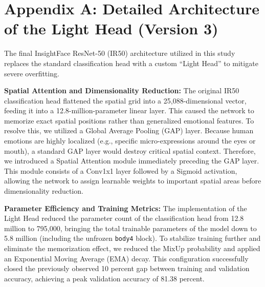 \section{Appendix A: Detailed Architecture of the Light Head (Version 3)}
\label{sec:IR50}

The final InsightFace ResNet-50 (IR50) architecture utilized in this study replaces the standard classification head with a custom ``Light Head'' to mitigate severe overfitting. 

\textbf{Spatial Attention and Dimensionality Reduction:}
The original IR50 classification head flattened the spatial grid into a 25,088-dimensional vector, feeding it into a 12.8-million-parameter linear layer. This caused the network to memorize exact spatial positions rather than generalized emotional features. To resolve this, we utilized a Global Average Pooling (GAP) layer. Because human emotions are highly localized (e.g., specific micro-expressions around the eyes or mouth), a standard GAP layer would destroy critical spatial context. Therefore, we introduced a Spatial Attention module immediately preceding the GAP layer. This module consists of a Conv1x1 layer followed by a Sigmoid activation, allowing the network to assign learnable weights to important spatial areas before dimensionality reduction.

\textbf{Parameter Efficiency and Training Metrics:}
The implementation of the Light Head reduced the parameter count of the classification head from 12.8 million to 795,000, bringing the total trainable parameters of the model down to 5.8 million (including the unfrozen \texttt{body4} block). To stabilize training further and eliminate the memorization effect, we reduced the MixUp probability and applied an Exponential Moving Average (EMA) decay. This configuration successfully closed the previously observed 10 percent gap between training and validation accuracy, achieving a peak validation accuracy of 81.38 percent.
